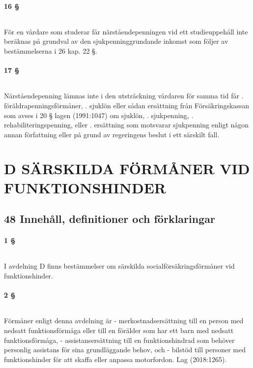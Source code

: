 \documentclass[a4paper,notitlepage,openany,10pt]{book}
\begin{document}
\subsection*{16 §}
\paragraph*{}
För en vårdare som studerar får närståendepenningen vid ett studieuppehåll inte beräknas på grundval av den sjukpenninggrundande inkomst som följer av bestämmelserna i 26 kap. 22 §.
\subsection*{17 §}
\paragraph*{}
Närståendepenning lämnas inte i den utsträckning vårdaren för samma tid får
. föräldrapenningsförmåner,
. sjuklön eller sådan ersättning från Försäkringskassan som avses i 20 § lagen (1991:1047) om sjuklön,
. sjukpenning,
. rehabiliteringspenning, eller
. ersättning som motsvarar sjukpenning enligt någon annan författning eller på grund av regeringens beslut i ett särskilt fall.
\part*{D SÄRSKILDA FÖRMÅNER VID FUNKTIONSHINDER}
\chapter*{48 Innehåll, definitioner och förklaringar}
\subsection*{1 §}
\paragraph*{}
I avdelning D finns bestämmelser om särskilda socialförsäkringsförmåner vid funktionshinder.
\subsection*{2 §}
\paragraph*{}
Förmåner enligt denna avdelning är
\newline - merkostnadsersättning till en person med nedsatt funktionsförmåga eller till en förälder som har ett barn med nedsatt funktionsförmåga,
\newline - assistansersättning till en funktionshindrad som behöver personlig assistans för sina grundläggande behov, och
\newline - bilstöd till personer med funktionshinder för att skaffa eller anpassa motorfordon.
Lag (2018:1265).
\end{document}
